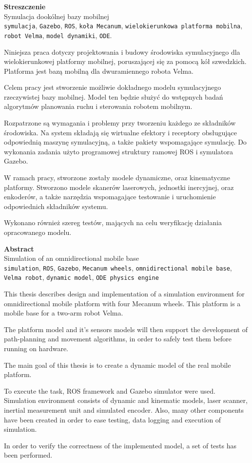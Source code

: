 {\centering\Large\bfseries Streszczenie \\}
 Symulacja dookólnej bazy mobilnej \\
 \texttt{symulacja}, \texttt{Gazebo}, \texttt{ROS}, \texttt{koła Mecanum}, \texttt{wielokierunkowa platforma mobilna}, \texttt{robot Velma}, \texttt{model dynamiki}, \texttt{ODE}.

Niniejsza praca dotyczy projektowania i budowy środowiska symulacyjnego dla wielokierunkowej platformy mobilnej, poruszającej się za pomocą kół szwedzkich.
Platforma jest bazą mobilną dla dwuramiennego robota Velma. 

Celem pracy jest stworzenie możliwie dokładnego modelu symulacyjnego rzeczywistej bazy mobilnej.
Model ten będzie służyć do wstępnych badań algorytmów planowania ruchu i sterowania robotem mobilnym.

Rozpatrzone są wymagania i problemy przy tworzeniu każdego ze składników środowiska.
Na system składają się wirtualne efektory i receptory obsługujące odpowiednią maszynę symulacyjną, a także pakiety wspomagające symulację.
Do wykonania zadania użyto programowej struktury ramowej ROS i symulatora Gazebo.

W ramach pracy, stworzone zostały modele dynamiczne, oraz kinematyczne platformy.
Stworzono modele skanerów laserowych, jednostki inercyjnej, oraz enkoderów, a także narzędzia wspomagające testowanie i uruchomienie odpowiednich składników systemu.

Wykonano również szereg testów, mających na celu weryfikację działania opracowanego modelu.

{\centering\Large\bfseries Abstract \\}
 Simulation of an omnidirectional mobile base \\
 \texttt{simulation}, \texttt{ROS}, \texttt{Gazebo}, \texttt{Mecanum wheels}, \texttt{omnidirectional mobile base}, \texttt{Velma robot}, \texttt{dynamic model}, \texttt{ODE physics engine}

This thesis describes design and implementation of a simulation environment for omnidirectional mobile platform with four Mecanum wheels.
This platform is a mobile base for a two-arm robot Velma.

The platform model and it's sensors models will then support the development of path-planning and movement algorithms, in order to safely test them before running on
hardware.

The main goal of this thesis is to create a dynamic model of the real mobile platform.

To execute the task, ROS framework and Gazebo simulator were used.
Simulation environment consists of dynamic and kinematic models, laser scanner, inertial measurement unit and simulated encoder. 
Also, many other components have been created in order to ease testing, data logging and execution of simulation.

In order to verify the correctness of the implemented model, a set of tests has been performed.
